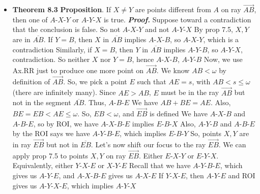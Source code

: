 \documentclass{report}
\begin{document}
\begin{itemize}
        \item \textbf{Theorem 8.3}
            \bigbreak \noindent 
            \textbf{Proposition}. If $X \ne Y$ are points different from $A$ on ray $\overrightarrow{AB}$, then one of $ A\text{-}X\text{-}Y$ or $ A\text{-}Y\text{-}X$ is true.
            \bigbreak \noindent 
            \textbf{\textit{Proof.}} Suppose toward a contradiction that the conclusion is false. So not $ A\text{-}X\text{-}Y$ and not $ A\text{-}Y\text{-}X $
            \bigbreak \noindent 
            By prop 7.5, $X,Y$ are in $\overline{AB}$. If $Y = B$, then $X$ in $\overline{AB}$ implies $ A\text{-}X\text{-}B$, so $ A\text{-}X\text{-}Y$, which is a contradiction
            \bigbreak \noindent 
            Similarly, if $X = B$, then $Y$ in $\overline{AB}$ implies $ A\text{-}Y\text{-}B$, so $ A\text{-}Y\text{-}X$, contradiction.
            \bigbreak \noindent 
            So neither $X$ nor $Y = B$, hence $ A\text{-}X\text{-}B$, $ A\text{-}Y\text{-}B$
            \bigbreak \noindent 
            Now, we use Ax.RR just to produce one more point on $\overrightarrow{AB}$. We know $AB < \omega$ by definition of $ \overrightarrow{AB}$. So, we pick a point $E$ such that $AE = s$, with $AB < s \leq \omega$ (there are infinitely many). Since $AE > AB$, $E$ must be in the ray $\overrightarrow{AB}$ but not in the segment $\overline{AB}$. Thus, $ A\text{-}B\text{-}E$
            \bigbreak \noindent 
            We have $AB + BE = AE$. Also, $BE = EB < AE \leq \omega$. So, $EB < \omega$, and $ \overrightarrow{EB}$ is defined
            \bigbreak \noindent 
            We have $ A\text{-}X\text{-}B$ and $ A\text{-}B\text{-}E$, so by ROI, we have $ A\text{-}X\text{-}B\text{-}E$ implies $ E\text{-}B\text{-}X $ 
            \bigbreak \noindent 
            Also, $ A\text{-}Y\text{-}B$ and $ A\text{-}B\text{-}E$ by the ROI says we have $ A\text{-}Y\text{-}B\text{-}E$, which implies $ E\text{-}B\text{-}Y $
            \bigbreak \noindent 
            So, points $X,Y$ are in ray $ \overrightarrow{EB}$ but not in $ \overline{EB} $. Let's now shift our focus to the ray $ \overrightarrow{EB}$. We can apply prop 7.5 to points $X,Y$ on ray $ \overrightarrow{EB}$. Either $ E\text{-}X\text{-}Y$ or $ E\text{-}Y\text{-}X$. Equivalently, either $ Y\text{-}X\text{-}E$ or $ X\text{-}Y\text{-}E $
            \bigbreak \noindent 
            Recall that we have $ A\text{-}Y\text{-}B\text{-}E$, which gives us $ A\text{-}Y\text{-}E$, and $ A\text{-}X\text{-}B\text{-}E$ gives us $ A\text{-}X\text{-}E$
            \bigbreak \noindent 
            If $ Y\text{-}X\text{-}E$, then $ A\text{-}Y\text{-}E$ and ROI gives us $ A\text{-}Y\text{-}X\text{-}E$, which implies $ A\text{-}Y\text{-}X$

\end{itemize}
\end{document}
